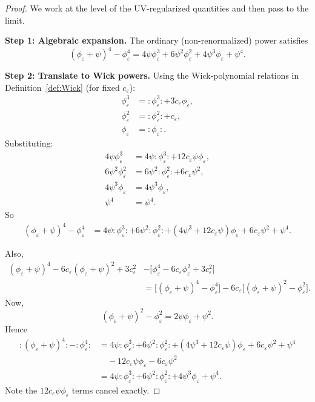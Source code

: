 \documentclass[12pt]{article}
\newcommand{\wick}[1]{:\!#1\!:}
\begin{document}
\begin{proof}
We work at the level of the UV-regularized quantities and then pass to the limit.

\textbf{Step 1: Algebraic expansion.}
The ordinary (non-renormalized) power satisfies
\[
  (\phi_\varepsilon + \psi)^4 - \phi_\varepsilon^4
  = 4\psi\phi_\varepsilon^3 + 6\psi^2\phi_\varepsilon^2 + 4\psi^3\phi_\varepsilon + \psi^4.
\]

\textbf{Step 2: Translate to Wick powers.}
Using the Wick-polynomial relations in Definition~\ref{def:Wick} (for fixed
$c_\varepsilon$):
\begin{align*}
  \phi_\varepsilon^3 &= \wick{\phi_\varepsilon^3} + 3c_\varepsilon\phi_\varepsilon,\\
  \phi_\varepsilon^2 &= \wick{\phi_\varepsilon^2} + c_\varepsilon,\\
  \phi_\varepsilon   &= \wick{\phi_\varepsilon}.
\end{align*}
Substituting:
\begin{align*}
  4\psi\phi_\varepsilon^3
  &= 4\psi\wick{\phi_\varepsilon^3} + 12c_\varepsilon\psi\phi_\varepsilon,\\
  6\psi^2\phi_\varepsilon^2
  &= 6\psi^2\wick{\phi_\varepsilon^2} + 6c_\varepsilon\psi^2,\\
  4\psi^3\phi_\varepsilon
  &= 4\psi^3\phi_\varepsilon,\\
  \psi^4 &= \psi^4.
\end{align*}
So
\begin{align*}
  (\phi_\varepsilon+\psi)^4 - \phi_\varepsilon^4
  &= 4\psi\wick{\phi_\varepsilon^3}
    + 6\psi^2\wick{\phi_\varepsilon^2}
    + (4\psi^3 + 12c_\varepsilon\psi)\phi_\varepsilon
    + 6c_\varepsilon\psi^2
    + \psi^4.
\end{align*}

Also,
\begin{align*}
  (\phi_\varepsilon+\psi)^4 - 6c_\varepsilon(\phi_\varepsilon+\psi)^2 + 3c_\varepsilon^2
  &- \bigl[\phi_\varepsilon^4 - 6c_\varepsilon\phi_\varepsilon^2 + 3c_\varepsilon^2\bigr]\\
  &= \bigl[(\phi_\varepsilon+\psi)^4 - \phi_\varepsilon^4\bigr]
    - 6c_\varepsilon\bigl[(\phi_\varepsilon+\psi)^2 - \phi_\varepsilon^2\bigr].
\end{align*}
Now,
\[
  (\phi_\varepsilon+\psi)^2 - \phi_\varepsilon^2 = 2\psi\phi_\varepsilon + \psi^2.
\]
Hence
\begin{align*}
  \wick{(\phi_\varepsilon+\psi)^4} - \wick{\phi_\varepsilon^4}
  &= 4\psi\wick{\phi_\varepsilon^3}
    + 6\psi^2\wick{\phi_\varepsilon^2}
    + (4\psi^3 + 12c_\varepsilon\psi)\phi_\varepsilon
    + 6c_\varepsilon\psi^2 + \psi^4\\
  &\quad - 12c_\varepsilon\psi\phi_\varepsilon - 6c_\varepsilon\psi^2\\
  &= 4\psi\wick{\phi_\varepsilon^3}
    + 6\psi^2\wick{\phi_\varepsilon^2}
    + 4\psi^3\phi_\varepsilon
    + \psi^4.
\end{align*}
Note the $12c_\varepsilon\psi\phi_\varepsilon$ terms cancel exactly.


\end{proof}
\end{document}
